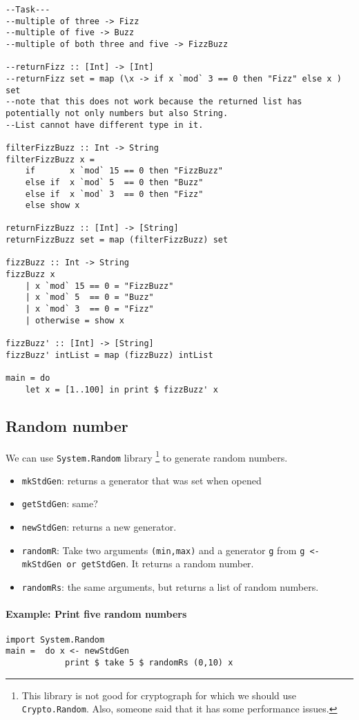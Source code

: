 \begin{lstlisting}
--Task---
--multiple of three -> Fizz
--multiple of five -> Buzz
--multiple of both three and five -> FizzBuzz

--returnFizz :: [Int] -> [Int]
--returnFizz set = map (\x -> if x `mod` 3 == 0 then "Fizz" else x ) set
--note that this does not work because the returned list has potentially not only numbers but also String.
--List cannot have different type in it.

filterFizzBuzz :: Int -> String
filterFizzBuzz x =
    if       x `mod` 15 == 0 then "FizzBuzz"
    else if  x `mod` 5  == 0 then "Buzz"
    else if  x `mod` 3  == 0 then "Fizz"
    else show x

returnFizzBuzz :: [Int] -> [String]
returnFizzBuzz set = map (filterFizzBuzz) set

fizzBuzz :: Int -> String
fizzBuzz x
    | x `mod` 15 == 0 = "FizzBuzz"
    | x `mod` 5  == 0 = "Buzz"
    | x `mod` 3  == 0 = "Fizz"
    | otherwise = show x

fizzBuzz' :: [Int] -> [String]
fizzBuzz' intList = map (fizzBuzz) intList

main = do
    let x = [1..100] in print $ fizzBuzz' x
 \end{lstlisting}
 
\subsection{Random number}
We can use \lstinline{System.Random} library \footnote{This library is not good for cryptograph for which we should use \lstinline{Crypto.Random}. Also, someone said that it has some performance issues.}  to generate random numbers.

\begin{itemize}
\item \lstinline{mkStdGen}: returns a generator that was set when opened
\item \lstinline{getStdGen}: same?
\item \lstinline{newStdGen}: returns a new generator.
\item \lstinline{randomR}: Take two arguments \lstinline{(min,max)} and a generator \lstinline{g} from \lstinline{g <- mkStdGen or getStdGen}. It returns a random number.
\item \lstinline{randomRs}: the same arguments, but returns a list of random numbers.
\end{itemize}

\paragraph{Example: Print five random numbers}

\begin{lstlisting}
import System.Random
main =  do x <- newStdGen
	        print $ take 5 $ randomRs (0,10) x 
\end{lstlisting}
